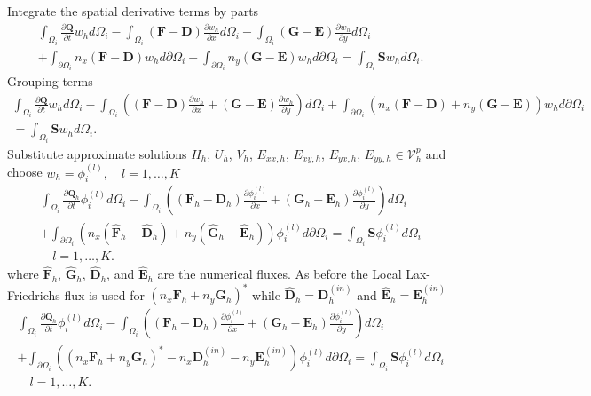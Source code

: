 \documentclass[11pt]{article}
\begin{document}
Integrate the spatial derivative terms by parts
\begin{multline}
\int_{\Omega_i}\frac{\partial \mathbf{Q}}{\partial t} w_h d\Omega_i - \int_{\Omega_i}\left(\mathbf{F}-\mathbf{D}\right) \frac{\partial w_h}{\partial x} d\Omega_i - \int_{\Omega_i}\left(\mathbf{G} - \mathbf{E} \right) \frac{\partial w_h}{\partial y} d\Omega_i \\ + \int_{\partial \Omega_i} n_x (\mathbf{F}-\mathbf{D})w_h d\partial\Omega_i + \int_{\partial \Omega_i} n_y (\mathbf{G}-\mathbf{E})w_h d\partial\Omega_i= \int_{\Omega_i}\mathbf{S}w_h d\Omega_i.
\end{multline}
Grouping terms
\begin{multline}
\int_{\Omega_i}\frac{\partial \mathbf{Q}}{\partial t} w_h d\Omega_i - \int_{\Omega_i}\left(\left(\mathbf{F}-\mathbf{D}\right) \frac{\partial w_h}{\partial x}  + \left(\mathbf{G} - \mathbf{E} \right) \frac{\partial w_h}{\partial y} \right)d\Omega_i + \int_{\partial \Omega_i} \left(n_x (\mathbf{F}-\mathbf{D})  +  n_y (\mathbf{G}-\mathbf{E}) \right)w_h d\partial\Omega_i \\ = \int_{\Omega_i}\mathbf{S}w_h d\Omega_i.
\end{multline}
Substitute approximate solutions $H_h$, $U_h$, $V_h$, $E_{xx,h}$, $E_{xy,h}$, $E_{yx,h}$, $E_{yy,h}\in \mathcal{V}_h^p$ and choose $w_h= \phi_i^{(l)},\quad l = 1,\ldots,K$
\begin{multline}
\int_{\Omega_i}\frac{\partial \mathbf{Q}_h}{\partial t} \phi_i^{(l)} d\Omega_i - \int_{\Omega_i}\left(\left(\mathbf{F}_h-\mathbf{D}_h\right) \frac{\partial \phi_i^{(l)}}{\partial x}  + \left(\mathbf{G}_h - \mathbf{E}_h \right) \frac{\partial \phi_i^{(l)}}{\partial y} \right)d\Omega_i \\ + \int_{\partial \Omega_i} \left(n_x (\widehat{\mathbf{F}}_h-\widehat{\mathbf{D}}_h)  +  n_y (\widehat{\mathbf{G}}_h-\widehat{\mathbf{E}}_h) \right)\phi_i^{(l)} d\partial\Omega_i  = \int_{\Omega_i}\mathbf{S}\phi_i^{(l)} d\Omega_i \\ \quad l = 1,\ldots,K.
\end{multline}
where $\widehat{\mathbf{F}}_h$, $\widehat{\mathbf{G}}_h$, $\widehat{\mathbf{D}}_h$, and $\widehat{\mathbf{E}}_h$ are the numerical fluxes.  As before the Local Lax-Friedrichs flux is used for $(n_x\mathbf{F}_h + n_y\mathbf{G}_h)^*$ while $\widehat{\mathbf{D}}_h = \mathbf{D}_h^{(in)}$ and $\widehat{\mathbf{E}}_h = \mathbf{E}_h^{(in)}$
\begin{multline}
\int_{\Omega_i}\frac{\partial \mathbf{Q}_h}{\partial t} \phi_i^{(l)} d\Omega_i - \int_{\Omega_i}\left(\left(\mathbf{F}_h-\mathbf{D}_h\right) \frac{\partial \phi_i^{(l)}}{\partial x}  + \left(\mathbf{G}_h - \mathbf{E}_h \right) \frac{\partial \phi_i^{(l)}}{\partial y} \right)d\Omega_i \\ + \int_{\partial \Omega_i} \left( (n_x\mathbf{F}_h + n_y\mathbf{G}_h)^*-n_x\mathbf{D}_h^{(in)}  -n_y\mathbf{E}_h^{(in)} \right)\phi_i^{(l)} d\partial\Omega_i  = \int_{\Omega_i}\mathbf{S}\phi_i^{(l)} d\Omega_i \\ \quad l = 1,\ldots,K.
\end{multline}
\end{document}
